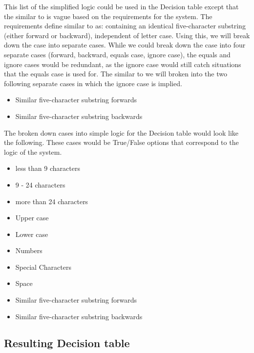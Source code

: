 \documentclass[12pt,letterpaper]{article}
\begin{document}
This list of the simplified logic could be used in the Decision table except that the similar to is vague based on the
requirements for the system. The requirements define similar to as: containing an identical five-character
substring (either forward or backward), independent of letter case.
Using this, we will break down the case into separate cases. While we could break down the case into
four separate cases (forward, backward, equals case, ignore case), the equals and
ignore cases would be redundant, as the ignore case would still catch situations that the equals
case is used for. The similar to we will broken into the two following separate cases in which the ignore case is implied.

\begin{itemize}
\item Similar five-character substring forwards
\item Similar five-character substring backwards
\end{itemize}

The broken down cases into simple logic for the Decision table would look like the following.
These cases would be True/False options that correspond to the logic of the system.

\begin{itemize}
\item less than 9 characters
\item 9 - 24 characters
\item more than 24 characters
\item Upper case
\item Lower case
\item Numbers
\item Special Characters
\item Space
\item Similar five-character substring forwards
\item Similar five-character substring backwards
\end{itemize}



\subsection{Resulting Decision table}

\end{document}
